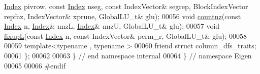 \begin{DoxyCode}
      \hyperlink{namespace_eigen_a62e77e0933482dafde8fe197d9a2cfde}{Index} pivrow, \textcolor{keyword}{const} \hyperlink{namespace_eigen_a62e77e0933482dafde8fe197d9a2cfde}{Index} nseg, \textcolor{keyword}{const} IndexVector& segrep, BlockIndexVector repfnz, IndexVector& 
      xprune, GlobalLU\_t& glu);
00056      \textcolor{keywordtype}{void} \hyperlink{group___sparse_l_u___module_acbede3f259186d48ad42ca093f80b64b}{countnz}(\textcolor{keyword}{const} \hyperlink{namespace_eigen_a62e77e0933482dafde8fe197d9a2cfde}{Index} n, \hyperlink{namespace_eigen_a62e77e0933482dafde8fe197d9a2cfde}{Index}& nnzL, \hyperlink{namespace_eigen_a62e77e0933482dafde8fe197d9a2cfde}{Index}& nnzU, GlobalLU\_t& glu); 
00057      \textcolor{keywordtype}{void} \hyperlink{group___sparse_l_u___module_ae1d1ed091956ff4e5734b4e3f79f866e}{fixupL}(\textcolor{keyword}{const} \hyperlink{namespace_eigen_a62e77e0933482dafde8fe197d9a2cfde}{Index} n, \textcolor{keyword}{const} IndexVector& perm\_r, GlobalLU\_t& glu); 
00058      
00059      \textcolor{keyword}{template}<\textcolor{keyword}{typename} , \textcolor{keyword}{typename} >
00060      \textcolor{keyword}{friend} \textcolor{keyword}{struct }column\_dfs\_traits;
00061 \}; 
00062 
00063 \} \textcolor{comment}{// end namespace internal}
00064 \} \textcolor{comment}{// namespace Eigen}
00065 
00066 \textcolor{preprocessor}{#endif}
\end{DoxyCode}
